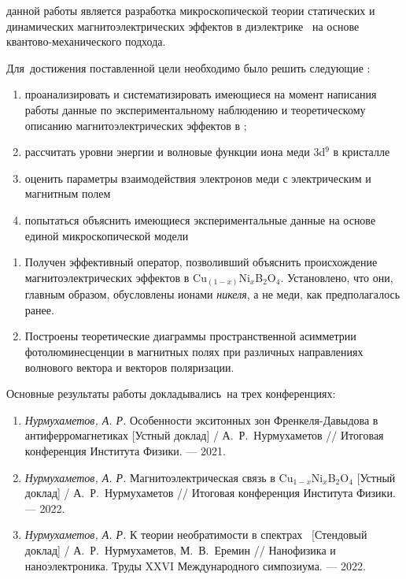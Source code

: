 
{\aim} данной работы является разработка микроскопической теории статических и динамических магнитоэлектрических эффектов в диэлектрике \cbo\ на основе квантово-механического подхода.

Для~достижения поставленной цели необходимо было решить следующие {\tasks}:
\begin{enumerate}[beginpenalty=10000] %
	\item проанализировать и систематизировать имеющиеся на момент написания работы данные по экспериментальному наблюдению и теоретическому описанию магнитоэлектрических эффектов в \cbo;
	\item рассчитать уровни энергии и волновые функции иона меди 3d\(^9\) в кристалле \cbo
	\item оценить параметры взаимодействия электронов меди с электрическим и магнитным полем
	\item попытаться объяснить  имеющиеся экспериментальные данные на основе  единой микроскопической модели 
\end{enumerate}


{\novelty}
\begin{enumerate}[beginpenalty=10000] %
	\item Получен эффективный оператор, позволивший объяснить происхождение магнитоэлектрических эффектов в	Cu$_{(1-x)}$Ni$_x$B$_2$O$_4$. Установлено, что они, главным образом, обусловлены ионами \emph{никеля}, а не меди, как предполагалось ранее.  
	\item Построены теоретические диаграммы пространственной асимметрии фотолюминесценции в магнитных полях при различных направлениях  волнового вектора и векторов поляризации.
\end{enumerate}


{\probation}
Основные результаты работы докладывались~на трех конференциях:
\begin{enumerate}[beginpenalty=10000] %
	\item \textit{Нурмухаметов, А. Р.} Особенности экситонных зон Френкеля-Давыдова в антиферромагнетиках [Устный доклад] / А.~Р.~Нурмухаметов // Итоговая конференция Института Физики. --- 2021.
	\item \textit{Нурмухаметов, А. Р.} Магнитоэлектрическая связь в Cu\(_{1-x}\)Ni\(_{x}\)B\(_{2}\)O\(_{4}\) [Устный доклад] / А.~Р.~Нурмухаметов // Итоговая конференция Института Физики. --- 2022.
	\item \textit{Нурмухаметов, А. Р.} К теории необратимости в спектрах \cbo\ [Стендовый доклад] / А.~Р.~Нурмухаметов, М.~В.~Еремин // Нанофизика и наноэлектроника. Труды XXVI Международного симпозиума. --- 2022.
\end{enumerate}

